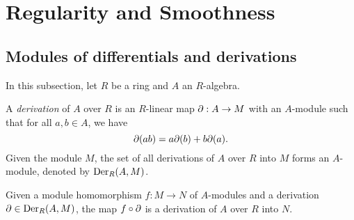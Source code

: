 \section{Regularity and Smoothness}

\subsection{Modules of differentials and derivations}

    In this subsection, let $R$ be a ring and $A$ an $R$-algebra.

    \begin{definition}[Derivation]\label{def: derivation}
        A \emph{derivation} of $A$ over $R$ is an $R$-linear map $\P: A \to M$ with an $A$-module such that for all $a, b \in A$, we have
        \[
            \P(ab) = a\P(b) + b\P(a).
        \]
        Given the module $M$, the set of all derivations of $A$ over $R$ into $M$ forms an \(A\)-module, denoted by $\Der_R(A, M)$.
    \end{definition}

    Given a module homomorphism \(f: M \to N\) of \(A\)-modules and a derivation \(\P \in \Der_R(A, M)\), the map $f \circ \P$ is a derivation of \(A\) over \(R\) into \(N\).

